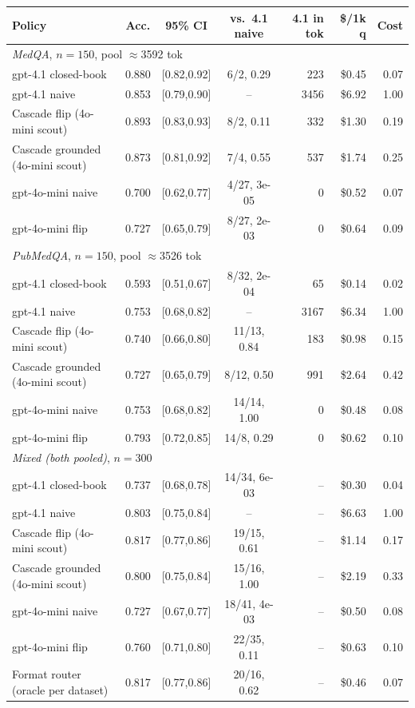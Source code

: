 \begin{tabular}{lcccrrr}
\toprule
Policy & Acc. & 95\% CI & vs.\ 4.1 naive & 4.1 in tok & \$/1k q & Cost \\
\midrule
\multicolumn{7}{l}{\textit{MedQA}, $n{=}150$, pool $\approx$3592 tok} \\
gpt-4.1 closed-book & 0.880 & [0.82,0.92] & 6/2, 0.29 & 223 & \$0.45 & 0.07 \\
gpt-4.1 naive & 0.853 & [0.79,0.90] & -- & 3456 & \$6.92 & 1.00 \\
Cascade flip (4o-mini scout) & 0.893 & [0.83,0.93] & 8/2, 0.11 & 332 & \$1.30 & 0.19 \\
Cascade grounded (4o-mini scout) & 0.873 & [0.81,0.92] & 7/4, 0.55 & 537 & \$1.74 & 0.25 \\
gpt-4o-mini naive & 0.700 & [0.62,0.77] & 4/27, 3e-05 & 0 & \$0.52 & 0.07 \\
gpt-4o-mini flip & 0.727 & [0.65,0.79] & 8/27, 2e-03 & 0 & \$0.64 & 0.09 \\
\midrule
\multicolumn{7}{l}{\textit{PubMedQA}, $n{=}150$, pool $\approx$3526 tok} \\
gpt-4.1 closed-book & 0.593 & [0.51,0.67] & 8/32, 2e-04 & 65 & \$0.14 & 0.02 \\
gpt-4.1 naive & 0.753 & [0.68,0.82] & -- & 3167 & \$6.34 & 1.00 \\
Cascade flip (4o-mini scout) & 0.740 & [0.66,0.80] & 11/13, 0.84 & 183 & \$0.98 & 0.15 \\
Cascade grounded (4o-mini scout) & 0.727 & [0.65,0.79] & 8/12, 0.50 & 991 & \$2.64 & 0.42 \\
gpt-4o-mini naive & 0.753 & [0.68,0.82] & 14/14, 1.00 & 0 & \$0.48 & 0.08 \\
gpt-4o-mini flip & 0.793 & [0.72,0.85] & 14/8, 0.29 & 0 & \$0.62 & 0.10 \\
\midrule
\multicolumn{7}{l}{\textit{Mixed (both pooled)}, $n{=}300$} \\
gpt-4.1 closed-book & 0.737 & [0.68,0.78] & 14/34, 6e-03 & -- & \$0.30 & 0.04 \\
gpt-4.1 naive & 0.803 & [0.75,0.84] & -- & -- & \$6.63 & 1.00 \\
Cascade flip (4o-mini scout) & 0.817 & [0.77,0.86] & 19/15, 0.61 & -- & \$1.14 & 0.17 \\
Cascade grounded (4o-mini scout) & 0.800 & [0.75,0.84] & 15/16, 1.00 & -- & \$2.19 & 0.33 \\
gpt-4o-mini naive & 0.727 & [0.67,0.77] & 18/41, 4e-03 & -- & \$0.50 & 0.08 \\
gpt-4o-mini flip & 0.760 & [0.71,0.80] & 22/35, 0.11 & -- & \$0.63 & 0.10 \\
Format router (oracle per dataset) & 0.817 & [0.77,0.86] & 20/16, 0.62 & -- & \$0.46 & 0.07 \\
\bottomrule
\end{tabular}
